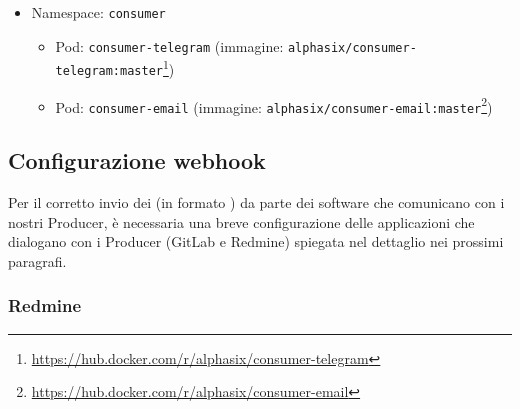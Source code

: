 \begin{itemize}
\begin{itemize}
		(immagine: \texttt{alphasix/gestore-personale-client:master}\footnote{\url{https://hub.docker.com/r/alphasix/gestore-personale-client}})
		\item Pod: \texttt{mongo} (immagine: \texttt{bitnami/mongodb:latest}\footnote{\url{https://hub.docker.com/r/bitnami/mongodb/}})
	\end{itemize}

	\item Namespace: \texttt{consumer}
	\begin{itemize}
		\item Pod: \texttt{consumer-telegram} (immagine: \texttt{alphasix/consumer-telegram:master}\footnote{\url{https://hub.docker.com/r/alphasix/consumer-telegram}})
		\item Pod: \texttt{consumer-email} (immagine: \texttt{alphasix/consumer-email:master}\footnote{\url{https://hub.docker.com/r/alphasix/consumer-email}})
	\end{itemize}
\end{itemize}


\subsection{Configurazione webhook}
Per il corretto invio dei  (in formato ) da parte dei software che comunicano con i nostri Producer, è necessaria una breve configurazione delle applicazioni che dialogano con i Producer (GitLab e Redmine) spiegata nel dettaglio nei prossimi paragrafi.

	\subsubsection{Redmine}
